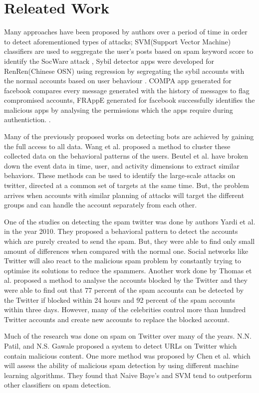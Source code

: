 \documentclass[conference]{IEEEtran}
\begin{document}
\section{Releated Work}
Many approaches have been proposed by authors over a period of time in order to detect aforementioned types of attacks; SVM(Support Vector Machine) classifiers are used to seggregate the user's posts based on spam keyword score to identify the SocWare attack \cite{1}, Sybil detector apps were developed for RenRen(Chinese OSN) using regression by segregating the sybil accounts with the normal accounts based on user behaviour \cite{2} \cite{3}. COMPA app generated for facebook compares every message generated with the history of messages to flag compromised accounts, FRAppE generated for facebook successfully identifies the malicious apps by analysing the permissions which the apps require during authentiction. \cite{4}.

Many of the previously proposed works on detecting bots are achieved by gaining the full access to all data. Wang et al. proposed a method to cluster these collected data on the behavioral patterns of the users. Beutel et al. have broken down the event data in time, user, and activity dimensions to extract similar behaviors. These methods can be used to identify the large-scale attacks on twitter, directed at a common set of targets at the same time. But, the problem arrives when accounts with similar planning of attacks will target the different groups and can handle the account separately from each other.

One of the studies on detecting the spam twitter was done by authors Yardi et al. \cite{5} in the year 2010. They proposed a behavioral pattern to detect the accounts which are purely created to send the spam. But, they were able to find only small amount of differences when compared with the normal one. Social networks like Twitter will also react to the malicious spam problem by constantly trying to optimise its solutions to reduce the spammers. Another work done by Thomas et al. \cite{6} proposed a method to analyse the accounts blocked by the Twitter and they were able to find out that 77 percent of the spam accounts can be detected by the Twitter if blocked within 24 hours and 92 percent of the spam accounts within three days. However, many of the celebrities control more than hundred Twitter accounts and create new accounts to replace the blocked account.

Much of the research was done on spam on Twitter over many of the years. N.N. Patil, and N.S. Gawale proposed a system to detect URLs on Twitter which contain malicious content\cite{7}. One more method was proposed by Chen et al. \cite{8} which will assess the ability of malicious spam detection by using different machine learning algorithms. They found that Naive Baye's and SVM tend to outperform other classifiers on spam detection.
\end{document}
